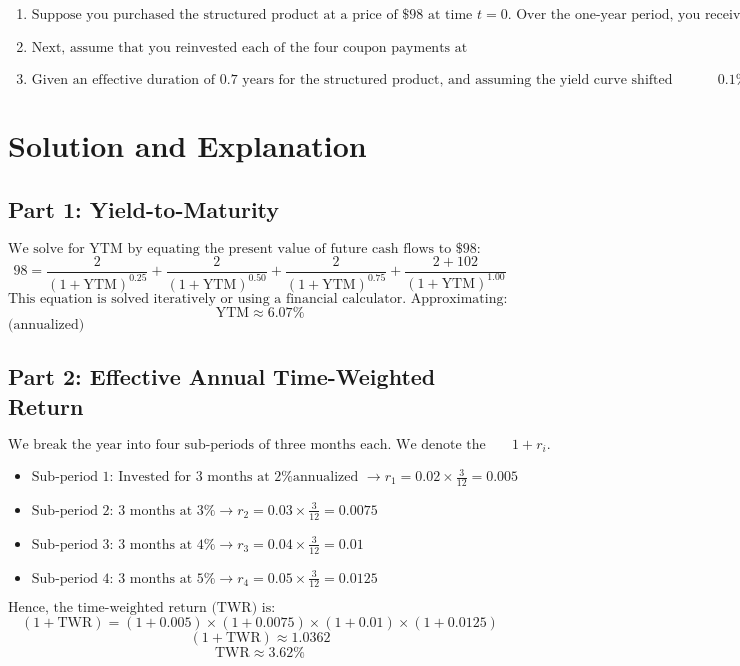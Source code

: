 \begin{enumerate}
\item \(
\text{Suppose you purchased the structured product at a price of \$98 at time } t=0 \text{. Over the one-year period, you received four coupon payments of \$2 each at quarterly intervals. The final redemption at maturity (including principal) was \$102. Calculate the YTM, assuming no reinvestment of the coupon proceeds.}
\)

\item \(
\text{Next, assume that you reinvested each of the four coupon payments at annualized rates of 2\%, 3\%, 4\%, and 5\%, respectively, from the time of receipt until year-end. Calculate the effective annual time-weighted return on the product, using a quarterly sub-period approach.}
\)

\item \(
\text{Given an effective duration of } 0.7 \text{ years for the structured product, and assuming the yield curve shifted upward by } 0.1\% \text{ during the year, compute the duration-adjusted time-weighted return.}
\)
\end{enumerate}

\section*{Solution and Explanation}
\subsection*{Part 1: Yield-to-Maturity}
\(
\text{We solve for YTM by equating the present value of future cash flows to \$98:}
\)
\[
98 
= \frac{2}{(1 + \text{YTM})^{0.25}} 
+ \frac{2}{(1 + \text{YTM})^{0.50}} 
+ \frac{2}{(1 + \text{YTM})^{0.75}}
+ \frac{2 + 102}{(1 + \text{YTM})^{1.00}}
\]
\(
\text{This equation is solved iteratively or using a financial calculator. Approximating:}
\)
\[
\text{YTM} \approx 6.07\%
\]
\(
\text{(annualized)} 
\)

\subsection*{Part 2: Effective Annual Time-Weighted Return}
\(
\text{We break the year into four sub-periods of three months each. We denote the growth factor for each sub-period as } 1 + r_i. 
\)
\begin{itemize}
\item \(
\text{Sub-period 1: Invested for 3 months at 2\% annualized } \rightarrow 
r_1 = 0.02 \times \frac{3}{12} = 0.005
\)
\item \(
\text{Sub-period 2: 3 months at 3\% } \rightarrow 
r_2 = 0.03 \times \frac{3}{12} = 0.0075
\)
\item \(
\text{Sub-period 3: 3 months at 4\% } \rightarrow 
r_3 = 0.04 \times \frac{3}{12} = 0.01
\)
\item \(
\text{Sub-period 4: 3 months at 5\% } \rightarrow 
r_4 = 0.05 \times \frac{3}{12} = 0.0125
\)
\end{itemize}
\(
\text{Hence, the time-weighted return (TWR) is:}
\)
\[
(1 + \text{TWR}) 
= (1 + 0.005)\times(1 + 0.0075)\times(1 + 0.01)\times(1 + 0.0125)
\]
\[
(1 + \text{TWR}) 
\approx 1.0362
\]
\[
\text{TWR} \approx 3.62\%
\]

